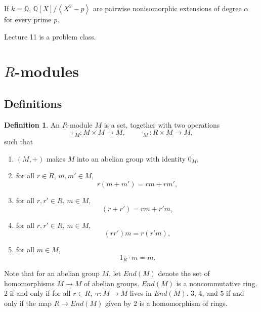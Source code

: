 \documentclass{article}
\newcommand{\Q}{\mathbb{Q}}
\newcommand{\rb}[1]{\left( #1 \right)}
\renewcommand{\sb}[1]{\left[ #1 \right]}
\newcommand{\ab}[1]{\left\langle #1 \right\rangle}
\theoremstyle{definition}\newtheorem{definition}{Definition}[subsection]
\theoremstyle{definition}\newtheorem{remark}[definition]{Remark}
\theoremstyle{definition}\newtheorem*{example}{Example}
\theoremstyle{definition}\newtheorem*{note}{Note}
\begin{document}
If $ k = \Q $, $ \Q\sb{X} / \ab{X^2 - p} $ are pairwise nonisomorphic extensions of degree $ \alpha $ for every prime $ p $.


Lecture 11 is a problem class.

\pagebreak


\section{$ R $-modules}

\subsection{Definitions}

\begin{definition}
An $ R $-module $ M $ is a set, together with two operations
$$ +_M : M \times M \to M, \qquad \cdot_M : R \times M \to M, $$
such that
\begin{enumerate}
\item $ \rb{M, +} $ makes $ M $ into an abelian group with identity $ 0_M $,
\item for all $ r \in R $, $ m, m' \in M $,
$$ r\rb{m + m'} = rm + rm', $$
\item for all $ r, r' \in R $, $ m \in M $,
$$ \rb{r + r'} = rm + r'm, $$
\item for all $ r, r' \in R $, $ m \in M $,
$$ \rb{rr'}m = r\rb{r'm}, $$
\item for all $ m \in M $,
$$ 1_R \cdot m = m. $$
\end{enumerate}
\end{definition}

Note that for an abelian group $ M $, let $ End\rb{M} $ denote the set of homomorphisms $ M \to M $ of abelian groups. $ End\rb{M} $ is a noncommutative ring. $ 2 $ if and only if for all $ r \in R $, $ \cdot r : M \to M $ lives in $ End\rb{M} $. $ 3 $, $ 4 $, and $ 5 $ if and only if the map $ R \to End\rb{M} $ given by $ 2 $ is a homomorphism of rings.
\end{document}
